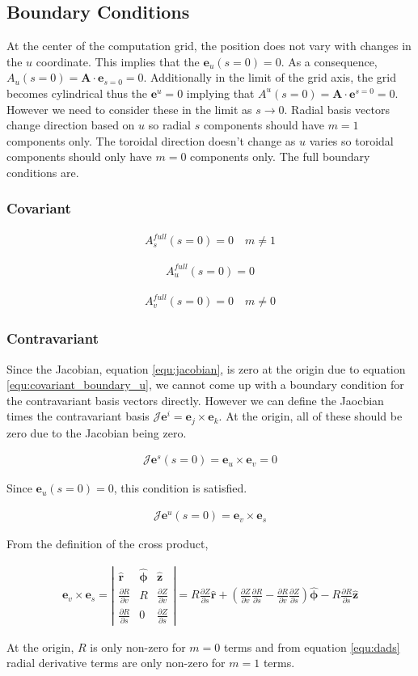 \documentclass[11pt]{article}
\newcommand{\brackets}[1]{\left(#1\right)}
\renewcommand{\vec}[1]{\boldsymbol#1}
\newcommand{\unitv}[1]{\hat{\vec{#1}}}
\newcommand{\co}[1]{\vec{e}_{#1}}
\newcommand{\con}[1]{\vec{e}^{#1}}
\newcommand{\pd}[2]{\frac{\partial#1}{\partial#2}}
\newcommand{\equ}[2]{
	\begin{equation}
    \begin{split}
	#1
	\label{#2}
	\end{split}
	\end{equation}
}
\newcommand{\crossp}[2]{#1\times#2}
\begin{document}
\subsection{Boundary Conditions}
At the center of the computation grid, the position does not vary with changes in the $u$ coordinate.
This implies that the $\co{u}\brackets{s=0}=0$.
As a consequence, $A_{u}\brackets{s=0}=\vec{A}\cdot\co{s=0}=0$.
Additionally in the limit of the grid axis, the grid becomes cylindrical thus the $\con{u}=0$ implying that $A^{u}\brackets{s=0}=\vec{A}\cdot\con{s=0}=0$.
However we need to consider these in the limit as $s\rightarrow 0$.
Radial basis vectors change direction based on $u$ so radial $s$ components should have $m=1$ components only.
The toroidal direction doesn't change as $u$ varies so toroidal components should only have $m=0$ components only. The full boundary conditions are.

\subsubsection{Covariant}
\equ{
A^{full}_{s}\brackets{s=0}=0\quad m \ne 1
}{equ:covariant_boundary_s}
\equ{
A^{full}_{u}\brackets{s=0}=0
}{equ:covariant_boundary_u}
\equ{
A^{full}_{v}\brackets{s=0}=0\quad m \ne 0
}{equ:covariant_boundary_v}

\subsubsection{Contravariant}
Since the Jacobian, equation \ref{equ:jacobian}, is zero at the origin due to equation \ref{equ:covariant_boundary_u}, we cannot come up with a boundary condition for the contravariant basis vectors directly.
However we can define the Jaocbian times the contravariant basis
$\mathcal{J}\con{i}=\crossp{\co{j}}{\co{k}}$.
At the origin, all of these should be zero due to the Jacobian being zero. 
\equ{
\mathcal{J}\con{s}\brackets{s=0}=\crossp{\co{u}}{\co{v}}=0
}{equ:contravariant_boundary_s}
Since $\co{u}\brackets{s=0}=0$, this condition is satisfied.
\equ{
\mathcal{J}\con{u}\brackets{s=0}=\crossp{\co{v}}{\co{s}}
}{equ:contravariant_boundary_u}
From the definition of the cross product,
\equ{
\crossp{\co{v}}{\co{s}}=\left|
\begin{array}{ccc}
\unitv{r} & \unitv{\phi} & \unitv{z} \\
\pd{R}{v} & R            & \pd{Z}{v} \\
\pd{R}{s} & 0            & \pd{Z}{s}
\end{array}
\right|=R\pd{Z}{s}\unitv{r}+\brackets{\pd{Z}{v}\pd{R}{s}-\pd{R}{v}\pd{Z}{s}}\unitv{\phi}-R\pd{R}{s}\unitv{z}
}{equ:ev_cross_es}
At the origin, $R$ is only non-zero for $m=0$ terms and from equation \ref{equ:dads} radial derivative terms are only non-zero for $m=1$ terms.
\end{document}

